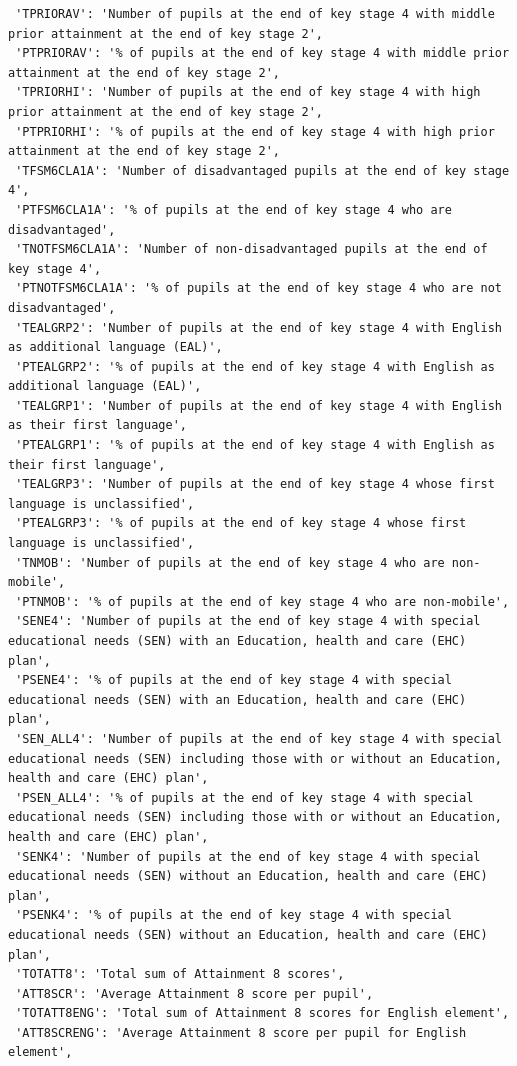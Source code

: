 \documentclass[
  letterpaper,
  DIV=11,
  numbers=noendperiod]{scrartcl}
\begin{document}
\begin{verbatim}
 'TPRIORAV': 'Number of pupils at the end of key stage 4 with middle prior attainment at the end of key stage 2',
 'PTPRIORAV': '% of pupils at the end of key stage 4 with middle prior attainment at the end of key stage 2',
 'TPRIORHI': 'Number of pupils at the end of key stage 4 with high prior attainment at the end of key stage 2',
 'PTPRIORHI': '% of pupils at the end of key stage 4 with high prior attainment at the end of key stage 2',
 'TFSM6CLA1A': 'Number of disadvantaged pupils at the end of key stage 4',
 'PTFSM6CLA1A': '% of pupils at the end of key stage 4 who are disadvantaged',
 'TNOTFSM6CLA1A': 'Number of non-disadvantaged pupils at the end of key stage 4',
 'PTNOTFSM6CLA1A': '% of pupils at the end of key stage 4 who are not disadvantaged',
 'TEALGRP2': 'Number of pupils at the end of key stage 4 with English as additional language (EAL)',
 'PTEALGRP2': '% of pupils at the end of key stage 4 with English as additional language (EAL)',
 'TEALGRP1': 'Number of pupils at the end of key stage 4 with English as their first language',
 'PTEALGRP1': '% of pupils at the end of key stage 4 with English as their first language',
 'TEALGRP3': 'Number of pupils at the end of key stage 4 whose first language is unclassified',
 'PTEALGRP3': '% of pupils at the end of key stage 4 whose first language is unclassified',
 'TNMOB': 'Number of pupils at the end of key stage 4 who are non-mobile',
 'PTNMOB': '% of pupils at the end of key stage 4 who are non-mobile',
 'SENE4': 'Number of pupils at the end of key stage 4 with special educational needs (SEN) with an Education, health and care (EHC) plan',
 'PSENE4': '% of pupils at the end of key stage 4 with special educational needs (SEN) with an Education, health and care (EHC) plan',
 'SEN_ALL4': 'Number of pupils at the end of key stage 4 with special educational needs (SEN) including those with or without an Education, health and care (EHC) plan',
 'PSEN_ALL4': '% of pupils at the end of key stage 4 with special educational needs (SEN) including those with or without an Education, health and care (EHC) plan',
 'SENK4': 'Number of pupils at the end of key stage 4 with special educational needs (SEN) without an Education, health and care (EHC) plan',
 'PSENK4': '% of pupils at the end of key stage 4 with special educational needs (SEN) without an Education, health and care (EHC) plan',
 'TOTATT8': 'Total sum of Attainment 8 scores',
 'ATT8SCR': 'Average Attainment 8 score per pupil',
 'TOTATT8ENG': 'Total sum of Attainment 8 scores for English element',
 'ATT8SCRENG': 'Average Attainment 8 score per pupil for English element',

\end{verbatim}
\end{document}
